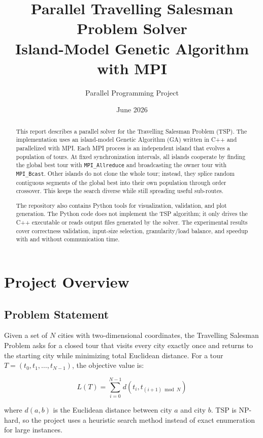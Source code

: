 \documentclass[11pt,a4paper]{article}
\title{\textbf{Parallel Travelling Salesman Problem Solver}\\
\large Island-Model Genetic Algorithm with MPI}
\author{Parallel Programming Project}
\date{June 2026}
\begin{document}
\maketitle

\begin{abstract}
This report describes a parallel solver for the Travelling Salesman Problem
(TSP). The implementation uses an island-model Genetic Algorithm (GA) written in
C++ and parallelized with MPI. Each MPI process is an independent island that
evolves a population of tours. At fixed synchronization intervals, all islands
cooperate by finding the global best tour with \texttt{MPI\_Allreduce} and
broadcasting the owner tour with \texttt{MPI\_Bcast}. Other islands do not clone
the whole tour; instead, they splice random contiguous segments of the global
best into their own population through order crossover. This keeps the search
diverse while still spreading useful sub-routes.

The repository also contains Python tools for visualization, validation, and
plot generation. The Python code does not implement the TSP algorithm; it only
drives the C++ executable or reads output files generated by the solver. The
experimental results cover correctness validation, input-size selection,
granularity/load balance, and speedup with and without communication time.
\end{abstract}

\tableofcontents
\newpage

\section{Project Overview}

\subsection{Problem Statement}
Given a set of $N$ cities with two-dimensional coordinates, the Travelling
Salesman Problem asks for a closed tour that visits every city exactly once and
returns to the starting city while minimizing total Euclidean distance. For a
tour $T = (t_0, t_1, \ldots, t_{N-1})$, the objective value is:

\[
  L(T) = \sum_{i=0}^{N-1} d(t_i, t_{(i+1) \bmod N})
\]

where $d(a,b)$ is the Euclidean distance between city $a$ and city $b$.
TSP is NP-hard, so the project uses a heuristic search method instead of exact
enumeration for large instances.
\end{document}

